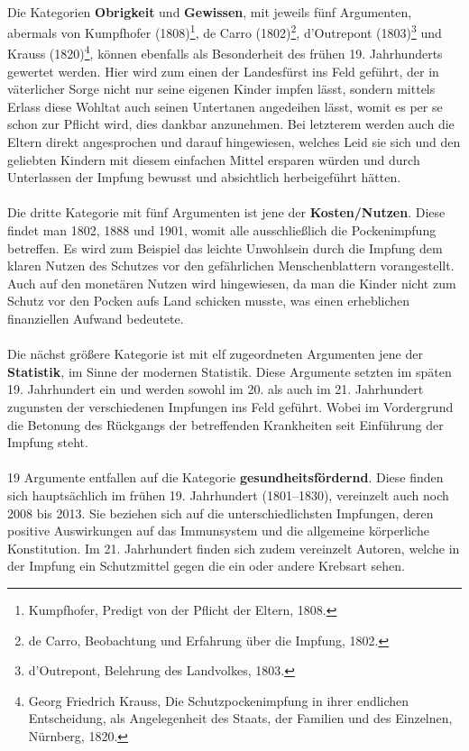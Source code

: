 \documentclass[
    a4paper,
    12pt,
    hyphens,
    chapterprefix=true,
    headheight=33pt,
    footheight=29pt,
    headings=optiontohead, %
]{scrartcl}
\begin{document}
{\\
Die Kategorien \textbf{Obrigkeit} und \textbf{Gewissen}, mit jeweils fünf Argumenten, abermals von Kumpfhofer (1808)\footnote{Kumpfhofer, Predigt von der Pflicht der Eltern, 1808.}, de Carro (1802)\footnote{de Carro, Beobachtung und Erfahrung über die Impfung, 1802.}, d'Outrepont (1803)\footnote{d'Outrepont, Belehrung des Landvolkes, 1803.} und Krauss (1820)\footnote{Georg Friedrich Krauss, Die Schutzpockenimpfung in ihrer endlichen Entscheidung, als Angelegenheit des Staats, der Familien und des Einzelnen, Nürnberg, 1820.}, können ebenfalls als Besonderheit des frühen 19. Jahrhunderts gewertet werden. Hier wird zum einen der Landesfürst ins Feld geführt, der in väterlicher Sorge nicht nur seine eigenen Kinder impfen lässt, sondern mittels Erlass diese Wohltat auch seinen Untertanen angedeihen lässt, womit es per se schon zur Pflicht wird, dies dankbar anzunehmen. Bei letzterem werden auch die Eltern direkt angesprochen und darauf hingewiesen, welches Leid sie sich und den geliebten Kindern mit diesem einfachen Mittel ersparen würden und durch Unterlassen der Impfung bewusst und absichtlich herbeigeführt hätten.\\
\\
Die dritte Kategorie mit fünf Argumenten ist jene der \textbf{Kosten/Nutzen}. Diese findet man 1802, 1888 und 1901, womit alle ausschließlich die Pockenimpfung betreffen. Es wird zum Beispiel das leichte Unwohlsein durch die Impfung dem klaren Nutzen des Schutzes vor den gefährlichen Menschenblattern vorangestellt. Auch auf den monetären Nutzen wird hingewiesen, da man die Kinder nicht zum Schutz vor den Pocken aufs Land schicken musste, was einen erheblichen finanziellen Aufwand bedeutete.\\
\\
Die nächst größere Kategorie ist mit elf zugeordneten Argumenten jene der \textbf{Statistik}, im Sinne der modernen Statistik. Diese Argumente setzten im späten 19. Jahrhundert ein und werden sowohl im 20. als auch im 21. Jahrhundert zugunsten der verschiedenen Impfungen ins Feld geführt. Wobei im Vordergrund die Betonung des Rückgangs der betreffenden Krankheiten seit Einführung der Impfung steht.\\
\\
19 Argumente entfallen auf die Kategorie \textbf{gesundheitsfördernd}. Diese finden sich hauptsächlich im frühen 19. Jahrhundert (1801--1830), vereinzelt auch noch 2008 bis 2013. Sie beziehen sich auf die unterschiedlichsten Impfungen, deren positive Auswirkungen auf das Immunsystem und die allgemeine körperliche Konstitution. Im 21. Jahrhundert finden sich zudem vereinzelt Autoren, welche in der Impfung ein Schutzmittel gegen die ein oder andere Krebsart sehen.\\
}
\end{document}
